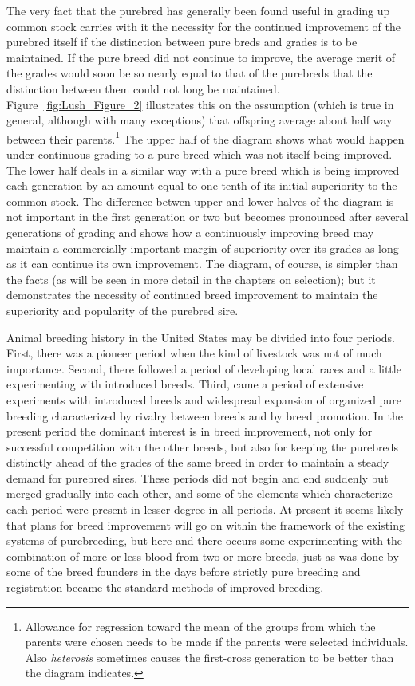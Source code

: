 The very fact that the purebred has generally been found useful in grading up common stock carries with it the necessity 
for the continued improvement of the purebred itself if the distinction between pure breds and grades is to be maintained. 
If the pure breed did not continue to improve, the average merit of the grades would soon be so nearly equal to that of the 
purebreds that the distinction between them could not long be maintained. Figure~\ref{fig:Lush_Figure_2} illustrates this on the assumption
(which is true in general, although with many exceptions) that offspring average about half way between their
parents.\footnote{Allowance for regression toward the mean of the groups from which the parents were chosen needs to be 
made if the parents were selected individuals. Also \textit{heterosis} sometimes causes the first-cross generation to be 
better than the diagram indicates.} The upper half of the diagram shows what would happen under continuous grading to a 
pure breed which was not itself being improved. The lower half deals in a similar way with a pure breed which is being 
improved each generation by an amount equal to one-tenth of its initial superiority to the common stock. The difference 
betwen upper and lower halves of the diagram is not important in the first generation or two but becomes 
pronounced after several generations of grading and shows how a continuously improving breed may maintain a commercially 
important margin of superiority over its grades as long as it can continue its own improvement. The diagram, of course, is 
simpler than the facts (as will be seen in more detail in the chapters on selection); but it demonstrates the necessity of 
continued breed improvement to maintain the superiority and popularity of the purebred sire.

Animal breeding history in the United States may be divided into four periods. First, there was a pioneer period when the 
kind of livestock was not of much importance. Second, there followed a period of developing local races and a little 
experimenting with introduced breeds. Third, came a period of extensive experiments with introduced breeds and widespread 
expansion of organized pure breeding characterized by rivalry between breeds and by breed promotion. In the present period 
the dominant interest is in breed improvement, not only for successful competition with the other breeds, but also for 
keeping the purebreds distinctly ahead of the grades of the same breed in order to maintain a steady demand for purebred 
sires. These periods did not begin and end suddenly but merged gradually into each other, and some of the elements which 
characterize each period were present in lesser degree in all periods. At present it seems likely that plans for
breed improvement will go on within the framework of the existing systems of purebreeding, but here and there occurs some 
experimenting with the combination of more or less blood from two or more breeds, just as was done by some of the breed 
founders in the days before strictly pure breeding and registration became the standard methods of improved breeding.
